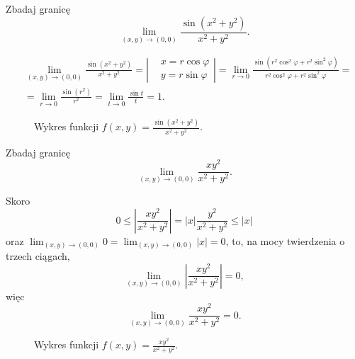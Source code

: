 \begin{example}
    Zbadaj granicę
    \[ \lim_{(x, y)\to (0, 0)} \frac{\sin(x^2 + y^2)}{x^2 + y^2}. \]
\end{example}
\begin{solution}
    \begin{align*}
        &\lim_{(x, y)\to (0, 0)} \frac{\sin(x^2 + y^2)}{x^2 + y^2} = \left|\begin{alignedat}{2}&x = r\cos\varphi \\ &y = r\sin\varphi\end{alignedat}\right| = \lim_{r\to 0} \frac{\sin(r^2\cos^2\varphi + r^2\sin^2\varphi)}{r^2\cos^2\varphi + r^2\sin^2\varphi} = \\
        &= \lim_{r\to 0} \frac{\sin(r^2)}{r^2} = \lim_{t\to 0} \frac{\sin t}{t} = 1.
    \end{align*}
\end{solution}

\begin{figure}[H]
    \centering
    \caption{Wykres funkcji $f(x, y) = \frac{\sin(x^2 + y^2)}{x^2 + y^2}$.}
\end{figure}

\begin{example}
    Zbadaj granicę
    \[ \lim_{(x, y)\to (0, 0)} \frac{xy^2}{x^2 + y^2}. \]
\end{example}
\begin{solution}
    Skoro
    \[ 0 \leq \left|\frac{xy^2}{x^2 + y^2}\right| = |x|\frac{y^2}{x^2 + y^2} \leq |x| \]
    oraz $\lim_{(x, y)\to (0, 0)} 0 = \lim_{(x, y)\to (0, 0)} |x| = 0$, to, na mocy twierdzenia o trzech ciągach,
    \[ \lim_{(x, y)\to (0, 0)} \left|\frac{xy^2}{x^2 + y^2}\right| = 0, \]
    więc
    \[ \lim_{(x, y)\to (0, 0)} \frac{xy^2}{x^2 + y^2} = 0. \]
\end{solution}

\begin{figure}[H]
    \centering
    \caption{Wykres funkcji $f(x, y) = \frac{xy^2}{x^2 + y^2}$.}
\end{figure}

